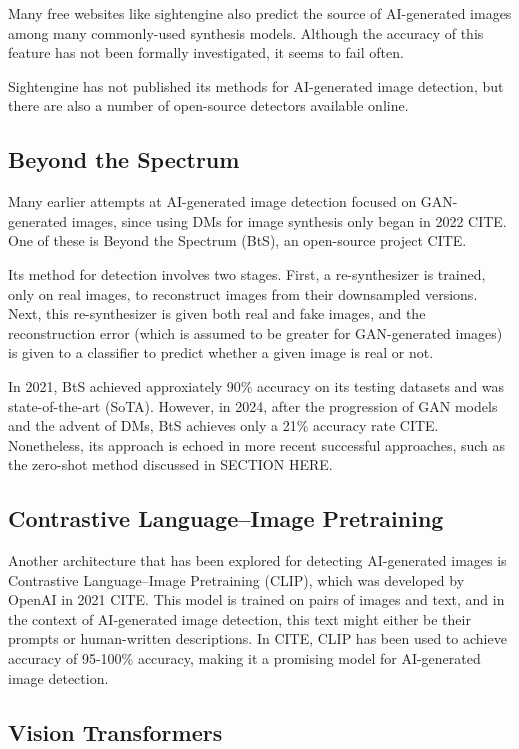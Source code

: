 \documentclass{article} %
\begin{document}
Many free websites like sightengine also predict the source of AI-generated images among many commonly-used synthesis models. Although the accuracy of this feature has not been formally investigated, it seems to fail often.

Sightengine has not published its methods for AI-generated image detection, but there are also a number of open-source detectors available online.

\subsection{Beyond the Spectrum}

Many earlier attempts at AI-generated image detection focused on GAN-generated images, since using DMs for image synthesis only began in 2022 CITE. One of these is Beyond the Spectrum (BtS), an open-source project CITE.

Its method for detection involves two stages. First, a re-synthesizer is trained, only on real images, to reconstruct images from their downsampled versions. Next, this re-synthesizer is given both real and fake images, and the reconstruction error (which is assumed to be greater for GAN-generated images) is given to a classifier to predict whether a given image is real or not.

In 2021, BtS achieved approxiately 90\% accuracy on its testing datasets and was state-of-the-art (SoTA). However, in 2024, after the progression of GAN models and the advent of DMs, BtS achieves only a 21\% accuracy rate CITE. Nonetheless, its approach is echoed in more recent successful approaches, such as the zero-shot method discussed in SECTION HERE.

\subsection{Contrastive Language–Image Pretraining}

Another architecture that has been explored for detecting AI-generated images is Contrastive Language–Image Pretraining (CLIP), which was developed by OpenAI in 2021 CITE. This model is trained on pairs of images and text, and in the context of AI-generated image detection, this text might either be their prompts or human-written descriptions. In CITE, CLIP has been used to achieve accuracy of 95-100\% accuracy, making it a promising model for AI-generated image detection.

\subsection{Vision Transformers}
\end{document}
